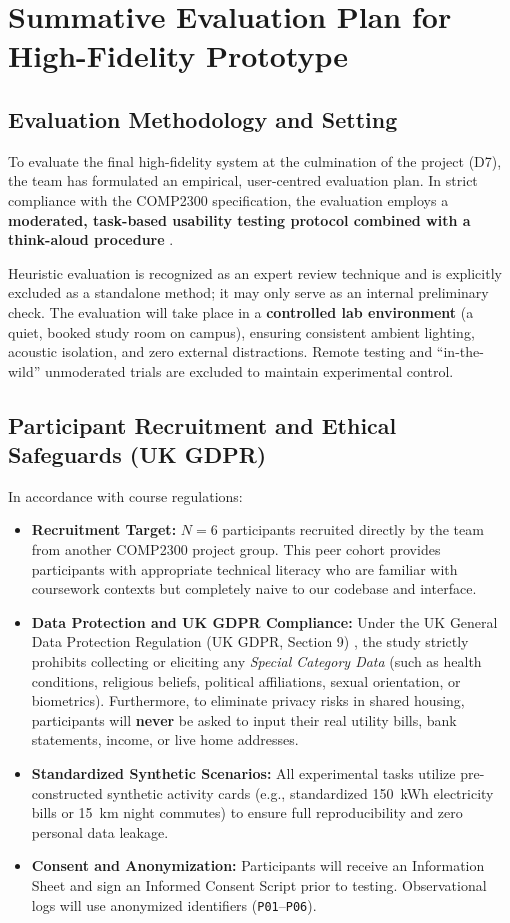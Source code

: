 \documentclass[12pt,a4paper]{article}
\newcommand{\code}[1]{\texttt{#1}}
\begin{document}
\section{Summative Evaluation Plan for High-Fidelity Prototype}

\subsection{Evaluation Methodology and Setting}
To evaluate the final high-fidelity system at the culmination of the project (D7), the team has formulated an empirical, user-centred evaluation plan. In strict compliance with the COMP2300 specification, the evaluation employs a \textbf{moderated, task-based usability testing protocol combined with a think-aloud procedure} \cite{lasarov2024}. 

Heuristic evaluation is recognized as an expert review technique and is explicitly excluded as a standalone method; it may only serve as an internal preliminary check. The evaluation will take place in a \textbf{controlled lab environment} (a quiet, booked study room on campus), ensuring consistent ambient lighting, acoustic isolation, and zero external distractions. Remote testing and ``in-the-wild'' unmoderated trials are excluded to maintain experimental control.

\subsection{Participant Recruitment and Ethical Safeguards (UK GDPR)}
In accordance with course regulations:
\begin{itemize}[leftmargin=*]
  \item \textbf{Recruitment Target:} $N = 6$ participants recruited directly by the team from another COMP2300 project group. This peer cohort provides participants with appropriate technical literacy who are familiar with coursework contexts but completely naive to our codebase and interface.
  \item \textbf{Data Protection and UK GDPR Compliance:} Under the UK General Data Protection Regulation (UK GDPR, Section 9) \cite{ico2024}, the study strictly prohibits collecting or eliciting any \emph{Special Category Data} (such as health conditions, religious beliefs, political affiliations, sexual orientation, or biometrics). Furthermore, to eliminate privacy risks in shared housing, participants will \textbf{never} be asked to input their real utility bills, bank statements, income, or live home addresses.
  \item \textbf{Standardized Synthetic Scenarios:} All experimental tasks utilize pre-constructed synthetic activity cards (e.g., standardized 150~kWh electricity bills or 15~km night commutes) to ensure full reproducibility and zero personal data leakage.
  \item \textbf{Consent and Anonymization:} Participants will receive an Information Sheet and sign an Informed Consent Script prior to testing. Observational logs will use anonymized identifiers (\code{P01}--\code{P06}).
\end{itemize}
\end{document}
